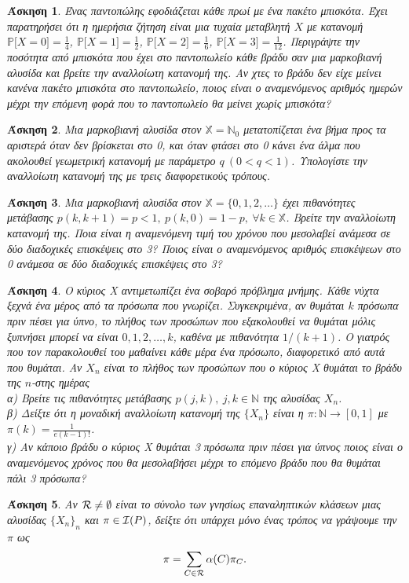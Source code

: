 \documentclass[11pt]{article}
\newtheorem{exercise}{Άσκηση}
\def\N{\mathbb{N}}
\def\X{\mathbb{X}}
\def\P{\mathbb{P}}
\def\IP{{\cal I}(P)}
\newcommand{\PP}[1]{\P\big[#1\big]}
\begin{document}
\begin{exercise}
Ένας παντοπώλης εφοδιάζεται κάθε πρωί με ένα πακέτο μπισκότα. Έχει παρατηρήσει ότι η ημερήσια ζήτηση είναι μια τυχαία μεταβλητή $X$ με κατανομή $\PP{X=0}=\frac{1}{4}$, $\PP{X=1}=\frac{1}{2}$, $\PP{X=2}=\frac{1}{6}$, $\PP{X=3}=\frac{1}{12}$. Περιγράψτε την ποσότητα από μπισκότα που έχει στο παντοπωλείο κάθε βράδυ σαν μια μαρκοβιανή αλυσίδα και βρείτε την αναλλοίωτη κατανομή της. Αν χτες το βράδυ δεν είχε μείνει κανένα πακέτο μπισκότα στο παντοπωλείο, ποιος είναι ο αναμενόμενος αριθμός ημερών μέχρι την επόμενη φορά που το παντοπωλείο θα μείνει χωρίς μπισκότα?
\end{exercise}
\begin{exercise}
Μια μαρκοβιανή αλυσίδα στον $\X=\N_0$ μετατοπίζεται ένα βήμα προς τα αριστερά όταν δεν βρίσκεται στο 0, και όταν φτάσει στο 0 κάνει ένα άλμα που ακολουθεί γεωμετρική κατανομή με παράμετρο $q\ (0<q<1)$. Υπολογίστε την αναλλοίωτη κατανομή της με τρεις διαφορετικούς τρόπους.
\end{exercise}
\begin{exercise}
Μια μαρκοβιανή αλυσίδα στον $\X=\{0,1,2,\ldots\}$ έχει πιθανότητες μετάβασης $p(k,k+1)=p<1,\ p(k,0)=1-p,\ \forall k\in\X$.
Βρείτε την αναλλοίωτη κατανομή της. Ποια είναι η αναμενόμενη τιμή του χρόνου που μεσολαβεί ανάμεσα σε δύο διαδοχικές επισκέψεις στο 3? Ποιος είναι ο αναμενόμενος αριθμός επισκέψεων στο 0 ανάμεσα σε δύο διαδοχικές επισκέψεις στο 3?
\end{exercise}
\begin{exercise}
Ο  κύριος Χ αντιμετωπίζει ένα σοβαρό πρόβλημα μνήμης. Κάθε νύχτα ξεχνά ένα μέρος από τα πρόσωπα που γνωρίζει. Συγκεκριμένα, αν θυμάται $k$ πρόσωπα πριν πέσει για ύπνο, το πλήθος των προσώπων που εξακολουθεί να θυμάται μόλις ξυπνήσει μπορεί να είναι $0,1,2,\ldots,k$, καθένα με πιθανότητα $1/(k+1)$. Ο γιατρός που τον παρακολουθεί του μαθαίνει κάθε μέρα ένα πρόσωπο, διαφορετικό από αυτά που θυμάται. Αν $X_n$ είναι το πλήθος των προσώπων που ο κύριος Χ θυμάται το βράδυ της $n$-στης ημέρας\\[2mm]
α) Βρείτε τις πιθανότητες μετάβασης $p(j,k),\ j,k\in\N$ της αλυσίδας $X_n$.\\
β) Δείξτε ότι η μοναδική αναλλοίωτη κατανομή της $\{X_n\}$ είναι η $\pi:\N\to[0,1]$ με $\pi(k)=\frac{1}{e(k-1)!}$.\\
γ) Αν κάποιο βράδυ ο κύριος Χ θυμάται 3 πρόσωπα πριν πέσει για ύπνος ποιος είναι ο αναμενόμενος χρόνος που θα μεσολαβήσει μέχρι το επόμενο βράδυ που θα θυμάται πάλι 3 πρόσωπα? 
\end{exercise}
\begin{exercise}
Αν ${\cal R}\neq\emptyset$ είναι το σύνολο των γνησίως επαναληπτικών κλάσεων μιας αλυσίδας $\{X_n\}_n$ και $\pi\in\IP$,  δείξτε ότι υπάρχει μόνο ένας τρόπος να γράψουμε την $\pi$ ως
\[
\pi=\sum_{C\in{\cal R}} \alpha(C)\pi_C.
\]
\end{exercise}
\end{document}
